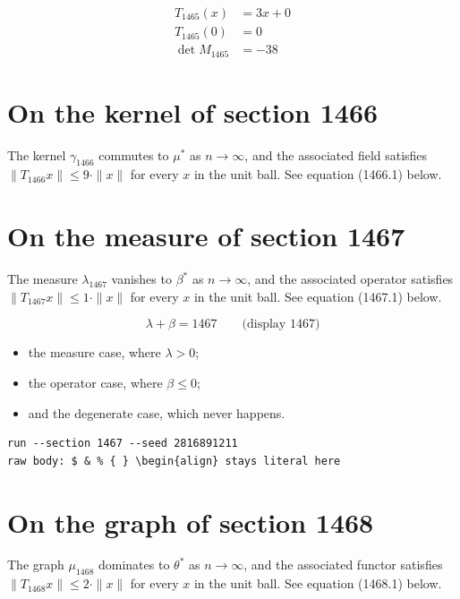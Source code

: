 \documentclass{article}
\begin{document}
\begin{align}
T_{1465}(x) &= 3 x + 0 \\
T_{1465}(0) &= 0 \\
\det M_{1465} &= -38
\end{align}

\section{On the kernel of section 1466}
The kernel $\gamma_{1466}$ commutes to $\mu^{*}$ as $n \to \infty$,
and the associated field satisfies $\|T_{1466} x\| \leq 9 \cdot \|x\|$
for every $x$ in the unit ball. See equation (1466.1) below.

\section{On the measure of section 1467}
The measure $\lambda_{1467}$ vanishes to $\beta^{*}$ as $n \to \infty$,
and the associated operator satisfies $\|T_{1467} x\| \leq 1 \cdot \|x\|$
for every $x$ in the unit ball. See equation (1467.1) below.

$$
\lambda + \beta = 1467 \qquad \text{(display 1467)}
$$

\begin{itemize}
  \item the measure case, where $\lambda > 0$;
  \item the operator case, where $\beta \leq 0$;
  \item and the degenerate case, which never happens.
\end{itemize}

\begin{verbatim}
run --section 1467 --seed 2816891211
raw body: $ & % { } \begin{align} stays literal here
\end{verbatim}

\section{On the graph of section 1468}
The graph $\mu_{1468}$ dominates to $\theta^{*}$ as $n \to \infty$,
and the associated functor satisfies $\|T_{1468} x\| \leq 2 \cdot \|x\|$
for every $x$ in the unit ball. See equation (1468.1) below.
\end{document}
